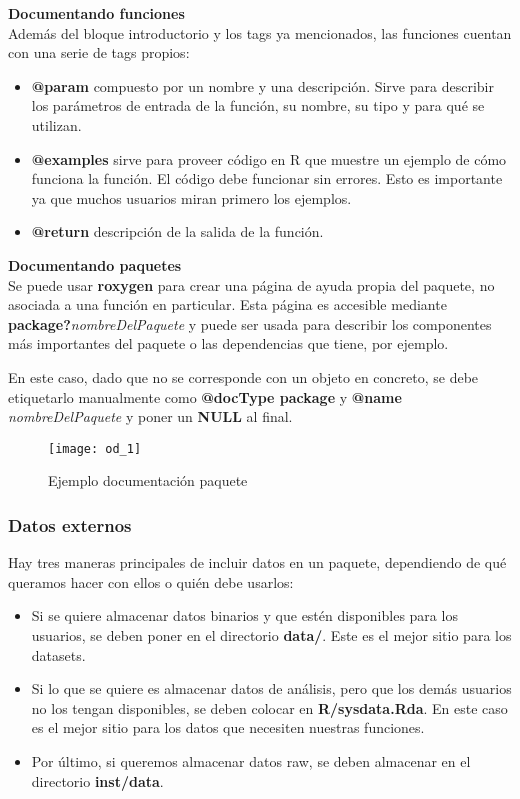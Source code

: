 \textbf{Documentando funciones} \\
Adem\'as del bloque introductorio y los tags ya mencionados, las funciones cuentan con una
serie de tags propios:
\begin{itemize}
    \item \textbf{@param} compuesto por un nombre y una descripci\'on. Sirve para describir los
par\'ametros de entrada de la funci\'on, su nombre, su tipo y para qu\'e se utilizan.
    \item \textbf{@examples} sirve para proveer c\'odigo en R que muestre un ejemplo de c\'omo funciona
la funci\'on. El c\'odigo debe funcionar sin errores. Esto es importante ya que muchos
usuarios miran primero los ejemplos.
    \item \textbf{@return} descripci\'on de la salida de la funci\'on.
\end{itemize}

\textbf{Documentando paquetes}\\
Se puede usar \textbf{roxygen} para crear una p\'agina de ayuda propia del paquete, no asociada a
una funci\'on en particular. Esta p\'agina es accesible mediante\\ \textbf{package?}\textit{nombreDelPaquete} y
puede ser usada para describir los componentes m\'as importantes del paquete o las
dependencias que tiene, por ejemplo.

En este caso, dado que no se corresponde con un objeto en concreto, se debe etiquetarlo
manualmente como \textbf{@docType package} y \textbf{@name} \textit{nombreDelPaquete} y poner un \textbf{NULL} al final.

\begin{figure}[H]
    \centering
    \texttt{[image: od\_1]}
    \caption{Ejemplo documentaci\'on paquete }
    \label{fig:paquete}
\end{figure} 

\subsubsection{Datos externos}

Hay tres maneras principales de incluir datos en un paquete, dependiendo de qu\'e queramos
hacer con ellos o qui\'en debe usarlos:

\begin{itemize}
    \item Si se quiere almacenar datos binarios y que est\'en disponibles para los usuarios, se
deben poner en el directorio \textbf{data/}. Este es el mejor sitio para los datasets.
    \item Si lo que se quiere es almacenar datos de an\'alisis, pero que los dem\'as usuarios no
los tengan disponibles, se deben colocar en \textbf{R/sysdata.Rda}. En este caso es el mejor
sitio para los datos que necesiten nuestras funciones.
    \item Por \'ultimo, si queremos almacenar datos raw, se deben almacenar en el directorio
\textbf{inst/data}.
\end{itemize}

